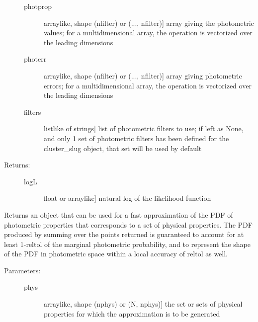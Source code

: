 \documentclass[letterpaper,10pt,english]{sphinxmanual}
\begin{document}
\begin{fulllineitems}
\begin{fulllineitems}
\begin{description}
\begin{description}
\item[{photprop}] \leavevmode{[}arraylike, shape (nfilter) or (..., nfilter){]}
array giving the photometric values; for a
multidimensional array, the operation is vectorized over
the leading dimensions

\item[{photerr}] \leavevmode{[}arraylike, shape (nfilter) or (..., nfilter){]}
array giving photometric errors; for a multidimensional
array, the operation is vectorized over the leading
dimensions

\item[{filters}] \leavevmode{[}listlike of strings{]}
list of photometric filters to use; if left as None, and
only 1 set of photometric filters has been defined for
the cluster\_slug object, that set will be used by
default

\end{description}

\item[{Returns:}] \leavevmode\begin{description}
\item[{logL}] \leavevmode{[}float or arraylike{]}
natural log of the likelihood function

\end{description}

\end{description}

\end{fulllineitems}


\begin{fulllineitems}
\label{cluster_slug:slugpy.cluster_slug.cluster_slug.make_approx_phot}
Returns an object that can be used for a fast approximation of
the PDF of photometric properties that corresponds to a set of
physical properties. The PDF produced by summing over the
points returned is guaranteed to account for at least 1-reltol
of the marginal photometric probability, and to represent the
shape of the PDF in photometric space within a local accuracy
of reltol as well.
\begin{description}
\item[{Parameters:}] \leavevmode\begin{description}
\item[{phys}] \leavevmode{[}arraylike, shape (nphys) or (N, nphys){]}
the set or sets of physical properties for which the
approximation is to be generated


\end{description}
\end{description}
\end{fulllineitems}
\end{fulllineitems}
\end{document}
